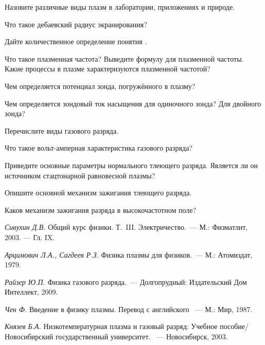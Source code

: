 \begin{lab:questions}

\item Назовите различные виды плазм в лаборатории, приложениях и природе.

\item Что такое дебаевский радиус экранирования?

\item Дайте количественное определение понятия .

\item Что такое плазменная частота? Выведите формулу для плазменной частоты.
Какие процессы в плазме характеризуются плазменной частотой?

\item Чем определяется потенциал зонда, погружённого в плазму?

\item Чем определяется зондовый ток насыщения для одиночного зонда? Для двойного
зонда?

\item Перечислите виды газового разряда.

\item Что такое вольт-амперная характеристика газового разряда?

\item Приведите основные параметры нормального тлеющего разряда. Является ли он
источником стацтонарной равновесной плазмы?

\item Опишите основной механизм зажигания тлеющего разряда.

\item Каков механизм зажигания разряда в высокочастотном поле?

\end{lab:questions}


\begin{lab:literature}

\item \emph{Сивухин Д.В.} Общий курс физики. Т.~III. Электричество.~--- М.:
Физматлит, 2003. --- Гл. IX.

\item \emph{Арцимович Л.А., Сагдеев Р.З.} Физика плазмы для физиков.~---
М.: Атомиздат, 1979.

\item \emph{Райзер Ю.П.} Физика газового разряда.~--- Долгопрудный: Издательский
Дом Интеллект, 2009.

\item \emph{Чен Ф.} Введение в физику плазмы. Перевод с английского ~--- М.:
Мир, 1987.

\item \emph{Князев Б.А.} Низкотемпературная плазма и газовый разряд: Учебное
пособие/ Новосибирский государственный университет. ~--- Новосибирск, 2003.
\end{lab:literature}
